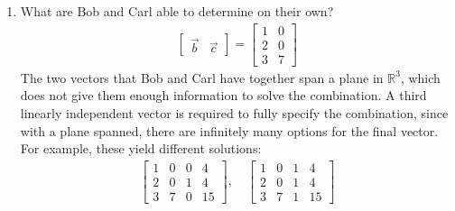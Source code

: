 \documentclass[10pt,letterpaper,final]{report}
\newcommand{\reason}[1]{&& \text{#1}}
\begin{document}
\begin{enumerate}[label=(\alph*)]
\begin{align*}
                                                & = \begin{pmatrix}4\\2\\0\end{pmatrix} + \begin{pmatrix}0\\2\\2\end{pmatrix} + \begin{pmatrix}1\\1\\0\end{pmatrix} \reason{By scalar multiplication}        \\[1ex]
                                                & = \begin{pmatrix}5\\5\\2\end{pmatrix} \reason{By vector addition}
        \end{align*}

        Therefore, the combination to the safe is $\begin{pmatrix}5\\5\\2\end{pmatrix}$.

  \item What are Bob and Carl able to determine on their own?
        \begin{align*}
          \begin{bmatrix}
            \vec{b} & \vec{c}
          \end{bmatrix}
          = \begin{bmatrix}
              1 & 0 \\
              2 & 0 \\
              3 & 7
            \end{bmatrix}
        \end{align*}
        The two vectors that Bob and Carl have together span a plane in $\mathbb{R}^3$, which does not give them enough information to solve the combination. A third linearly independent vector is required to fully specify the combination, since with a plane spanned, there are infinitely many options for the final vector. For example, these yield different solutions:
        \begin{align*}
          \left[\begin{array}{rrr|r}
              1 & 0 & 0 & 4  \\
              2 & 0 & 1 & 4  \\
              3 & 7 & 0 & 15
            \end{array}\right],
          \quad
          \left[\begin{array}{rrr|r}
              1 & 0 & 1 & 4  \\
              2 & 0 & 1 & 4  \\
              3 & 7 & 1 & 15
            \end{array}\right]
        \end{align*}


\end{enumerate}
\end{document}
